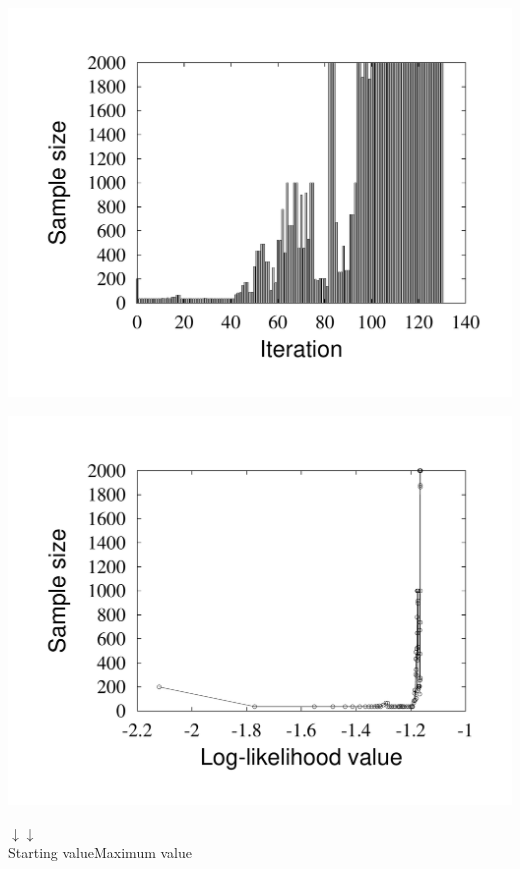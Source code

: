 \documentclass{beamer}
\begin{document}
\begin{frame}[fragile]
\begin{center}
\begin{minipage}{0.49\linewidth}
\includegraphics[width=\linewidth]{2000_sample_iter.pdf}
\end{minipage}
\begin{minipage}{0.49\linewidth}
\includegraphics[width=\linewidth]{2000_sample_fct.pdf}
\end{minipage}
\end{center}
\begin{tiny}
{%
\hspace*{6.8cm}$\downarrow$\hspace*{3cm}$\downarrow$\\
\hspace*{6.0cm}Starting value\hspace*{1.2cm}Maximum value\\
}
\end{tiny}

\end{frame}
\end{document}
